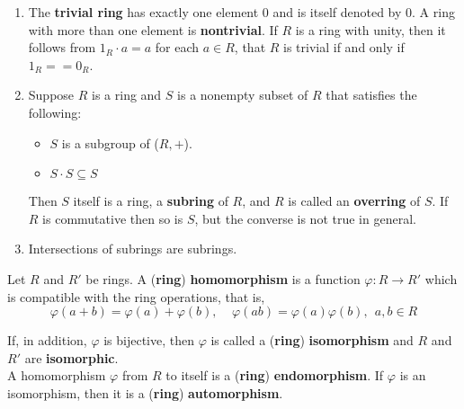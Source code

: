 \begin{eg}
    \begin{enumerate}[label=(\alph*)]
        \item The \textbf{trivial ring} has exactly one element 0 and is itself denoted by 0.
        A ring with more than one element is \textbf{nontrivial}. If \(R\) is a ring with unity,
        then it follows from \(1_R \cdot a = a\) for each \(a \in R\), that \(R\) is trivial 
        if and only if \(1_R == 0_R\).
        \item Suppose \(R\) is a ring and \(S\) is a nonempty subset of \(R\) that satisfies the
        following:
        \begin{itemize}
            \item \(S\) is a subgroup of (\(R, +\)). 
            \item \(S \cdot S \subseteq S\)
        \end{itemize}
        Then \(S\) itself is a ring, a \textbf{subring} of \(R\), and \(R\) is called an \textbf{overring}
        of \(S\). If \(R\) is commutative then so is \(S\), but the converse is not true in general.
        \item Intersections of subrings are subrings.
    \end{enumerate}
\end{eg}

\begin{definition}\label{def: ring_homomorphism}
    Let \(R\) and \(R{}'\) be rings. A (\textbf{ring}) \textbf{homomorphism} is a function
    \(\varphi \colon R \rightarrow R{}'\) which is compatible with the ring operations, that is,
    \begin{equation}
        \label{eqn: ring_homo}
        \varphi(a + b) = \varphi(a) + \varphi(b), \:\:\:\:\: \varphi(ab) = \varphi(a)\varphi(b), \:\: a,b \in R
    \end{equation}
\end{definition}

\begin{note}
    If, in addition, \(\varphi\) is bijective, then \(\varphi\) is called a (\textbf{ring}) \textbf{isomorphism}
    and \(R\) and \(R{}'\) are \textbf{isomorphic}.\\
    A homomorphism \(\varphi\) from \(R\) to itself is a (\textbf{ring}) \textbf{endomorphism}. If \(\varphi\)
    is an isomorphism, then it is a (\textbf{ring}) \textbf{automorphism}.
\end{note}

